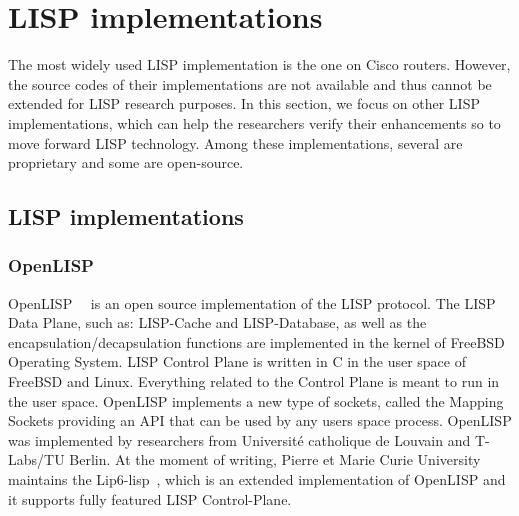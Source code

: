 \section{LISP implementations}
\label{sec:implementation}
The most widely used LISP implementation is the one on Cisco routers. %
However, the source codes of their implementations are not available and thus cannot be extended for LISP research purposes. In this section, we focus on other LISP implementations, which can help the researchers verify their enhancements so to move forward LISP technology. Among these implementations, several are proprietary and some are open-source. %

\subsection{LISP implementations}
\label{subsec:implementation_existing}

\subsubsection{OpenLISP}
\label{subsubsec:implementation_OpenLISP}
OpenLISP~\cite{OpenLISP}~\cite{phung2014openlisp} is an open source implementation of the LISP protocol. The LISP Data Plane, such as: LISP-Cache and LISP-Database, as well as the encapsulation/decapsulation functions are implemented in the kernel of FreeBSD~\cite{freeBSD} Operating System. LISP Control Plane is written in C in the user space of FreeBSD and Linux. Everything related to the Control Plane is meant to run in the user space. %
OpenLISP implements a new type of sockets, called the Mapping Sockets providing an API that can be used by any users space process. OpenLISP was implemented by researchers from Université catholique de Louvain and T-Labs/TU Berlin. At the moment of writing, Pierre et Marie Curie University maintains the Lip6-lisp~\cite{lip6lisp}, which is an extended implementation of OpenLISP and it supports fully featured LISP Control-Plane.


